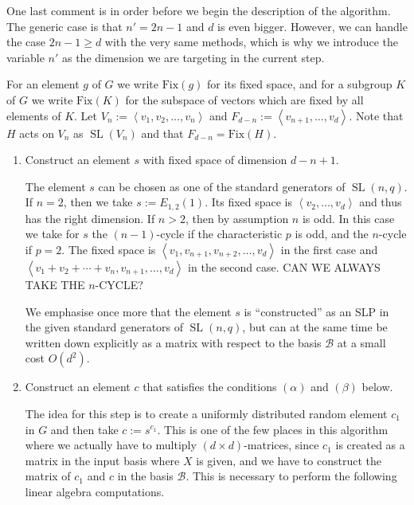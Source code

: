 \documentclass[a4paper,11pt]{article}
\def\SL{\operatorname{SL}}
\newcommand{\Fix}[1]{\mathrm{Fix}(#1)}
\newcommand{\B}{\mathcal{B}}
\begin{document}
One last comment is in order before we begin the description of the
algorithm. The generic case is that $n'=2n-1$ and $d$ is even bigger.
However, we can handle the case $2n-1 \ge d$ with the very same
methods, which is why we introduce the variable $n'$ as the dimension
we are targeting in the current step.

For an element $g$ of $G$ we write
$\Fix g$ for its fixed space, and for a subgroup $K$ of $G$ we write
$\Fix K$ for the subspace of vectors which are fixed by all elements
of $K$.
Let $V_n := \left< v_1, v_2, \ldots, v_n\right>$ and $F_{d-n} :=
\left< v_{n+1}, \ldots, v_d \right>$. Note that $H$ acts on $V_n$ as
$\SL(V_n)$ and that $F_{d-n} = \Fix H$.

\smallskip
\begin{enumerate}
\item Construct an element $s$ with fixed space of dimension $d-n+1$.

The element $s$ can be chosen as one of the standard generators of $\SL(n,q)$. 
If $n=2$, then we take $s := E_{1,2}(1)$. Its fixed space is 
$\left< v_2, \ldots, v_d\right>$ and thus
has the right dimension. If $n > 2$, then by assumption $n$ is odd.
In this case we take for $s$ the $(n-1)$-cycle if the characteristic $p$
is odd, and the $n$-cycle if $p=2$. The fixed
space is $\left< v_1, v_{n+1}, v_{n+2}, \ldots, v_d\right>$ in the first
case and $\left< v_1+v_2+\cdots+v_n, v_{n+1}, \ldots, v_d\right>$ in the
second case. CAN WE ALWAYS TAKE THE $n$-CYCLE?

We emphasise once more that the element $s$ is ``constructed'' as an SLP in
the given standard generators of $\SL(n,q)$, but can at the same time be
written down explicitly as a matrix with respect to the basis $\B$ at a
small cost $O(d^2)$.
\item Construct an element $c$ that satisfies the conditions $(\alpha)$ and $(\beta)$ 
below.

The idea for this step is to create a uniformly distributed random element 
$c_1$ in $G$ and then take $c := s^{c_1}$. This is one of the few places
in this algorithm where we actually have to multiply $(d \times
d)$-matrices, since $c_1$ is created as a matrix in the input basis where $X$ is given,
and we have to construct the matrix of $c_1$ and $c$ in the basis $\B$. 
This is necessary to perform the following linear algebra computations.


\end{enumerate}
\end{document}
